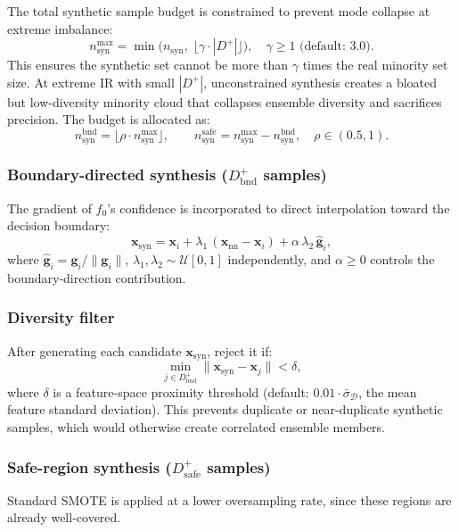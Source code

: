 \documentclass[11pt,a4paper]{article}
\newcommand{\Dplus}{D^{+}}
\newcommand{\Dbnd}{D^{+}_{\mathrm{bnd}}}
\newcommand{\Dsafe}{D^{+}_{\mathrm{safe}}}
\begin{document}
The total synthetic sample budget is constrained to prevent mode collapse at extreme imbalance:
\[
  n_{\mathrm{syn}}^{\max} = \min\!\bigl(n_{\mathrm{syn}},\; \lfloor\gamma \cdot |\Dplus|\rfloor\bigr),
  \quad \gamma \ge 1 \text{ (default: 3.0)}.
\]
This ensures the synthetic set cannot be more than $\gamma$ times the real minority set size.
At extreme IR with small $|\Dplus|$, unconstrained synthesis creates a bloated but low-diversity
minority cloud that collapses ensemble diversity and sacrifices precision. The budget is
allocated as:
\[
  n_{\mathrm{syn}}^{\mathrm{bnd}} = \lfloor\rho \cdot n_{\mathrm{syn}}^{\max}\rfloor, \qquad
  n_{\mathrm{syn}}^{\mathrm{safe}} = n_{\mathrm{syn}}^{\max} - n_{\mathrm{syn}}^{\mathrm{bnd}},
  \quad \rho \in (0.5, 1).
\]

\subsubsection*{Boundary-directed synthesis ($\Dbnd$ samples)}

The gradient of $f_0$'s confidence is incorporated to direct interpolation toward the decision
boundary:
\[
  \mathbf{x}_{\mathrm{syn}} = \mathbf{x}_i + \lambda_1\,(\mathbf{x}_{\mathrm{nn}} - \mathbf{x}_i)
                               + \alpha\,\lambda_2\,\hat{\mathbf{g}}_i,
\]
where $\hat{\mathbf{g}}_i = \mathbf{g}_i / \|\mathbf{g}_i\|$, $\lambda_1, \lambda_2 \sim \mathcal{U}[0,1]$
independently, and $\alpha \ge 0$ controls the boundary-direction contribution.

\subsubsection*{Diversity filter}

After generating each candidate $\mathbf{x}_{\mathrm{syn}}$, reject it if:
\[
  \min_{j \in \Dbnd} \|\mathbf{x}_{\mathrm{syn}} - \mathbf{x}_j\| < \delta,
\]
where $\delta$ is a feature-space proximity threshold (default: $0.01\cdot\bar{\sigma}_{\mathcal{D}}$,
the mean feature standard deviation). This prevents duplicate or near-duplicate synthetic samples,
which would otherwise create correlated ensemble members.

\subsubsection*{Safe-region synthesis ($\Dsafe$ samples)}

Standard SMOTE is applied at a lower oversampling rate, since these regions are already
well-covered.
\end{document}
